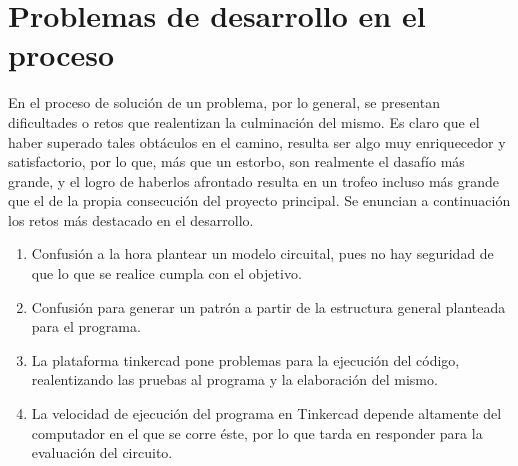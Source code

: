 \documentclass{article}
\begin{document}
\section{Problemas de desarrollo en el proceso}
En el proceso de solución de un problema, por lo general, se presentan dificultades o retos que realentizan la culminación del mismo. Es claro que el haber superado tales obtáculos en el camino, resulta ser algo muy enriquecedor y satisfactorio, por lo que, más que un estorbo, son realmente el dasafío más grande, y el logro de haberlos afrontado resulta en un trofeo incluso más grande que el de la propia consecución del proyecto principal. 
\newline
Se enuncian a continuación los retos más destacado en el desarrollo. 
\begin{enumerate}
    \item 
    Confusión a la hora plantear un modelo circuital, pues no hay seguridad de que lo que se realice cumpla con el objetivo.
    \item 
    Confusión para generar un patrón a partir de la estructura general planteada para el programa. 
    \item
    La plataforma tinkercad pone problemas para la ejecución del código, realentizando las pruebas al programa y la elaboración del mismo. 
    \item
    La velocidad de ejecución del programa en Tinkercad depende altamente del computador en el que se corre éste, por lo que tarda en responder para la evaluación del circuito.
\end{enumerate}
\end{document}
